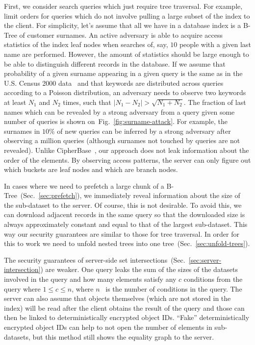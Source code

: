 \documentclass[notitlepage,longbibliography]{revtex4-1}
\newcommand{\figref}[1]{Fig.~\ref{#1}}
\begin{document}
First, we consider search queries which just require tree traversal.
For example, limit orders for queries which do not involve pulling a large subset of the index to the client.
For simplicity, let's assume that all we have in a database index is a B-Tree of customer surnames.
An active adversary is able to acquire access statistics of the index leaf nodes when searches of, say, $10$ people with a given last name are performed.
However, the amount of statistics should be large enough to be able to distinguish different records in the database.
If we assume that probability of a given surname appearing in a given query is the same as in the U.S. Census 2000 data~\cite{us-census-surnames}
and that keywords are distributed across queries according to a Poisson distribution,
an adversary needs to observe two keywords at least $N_1$ and $N_2$ times, such that $|N_1 - N_2| > \sqrt{N_1 + N_2}$.
The fraction of last names which can be revealed by a strong adversary from a query given some number of queries is shown on~\figref{fig:surname-attack}.
For example, the surnames in $10\%$ of new queries can be inferred by a strong adversary after observing a million queries (although surnames not touched by queries are not revealed).
Unlike CipherBase~\cite{cipherbase}, our approach does not leak information about the order of the elements.
By observing access patterns, the server can only figure out which buckets are leaf nodes and which are branch nodes.

In cases where we need to prefetch a large chunk of a B-Tree~(Sec.~\ref{sec:prefetch}), we immediately reveal information about the size of the sub-dataset to the server.
Of course, this is not desirable.
To avoid this, we can download adjacent records in the same query so that the downloaded size is always approximately constant and equal to that of the largest sub-dataset.
This way our security guarantees are similar to those for tree traversal.
In order for this to work we need to unfold nested trees into one tree~(Sec.~\ref{sec:unfold-trees}).

The security guarantees of server-side set intersections~(Sec.~\ref{sec:server-intersection}) are weaker.
One query leaks the sum of the sizes of the datasets involved in the query and how many elements satisfy any $c$ conditions from the query where $1\le c\le n$, where $n$~ is the number of conditions in the query.
The server can also assume that objects themselves (which are not stored in the index) will be read after the client obtains the result of the query and those can then be linked to deterministically encrypted object IDs.
``Fake'' deterministically encrypted object IDs can help to not open the number of elements in sub-datasets, but this method still shows the equality graph to the server.
\end{document}
